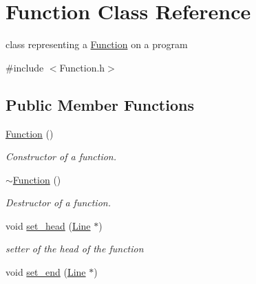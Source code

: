 \hypertarget{class_function}{}\section{Function Class Reference}
\label{class_function}


class representing a \hyperlink{class_function}{Function} on a program  




{\ttfamily \#include $<$Function.\+h$>$}

\subsection*{Public Member Functions}
\begin{DoxyCompactItemize}
\item 
\hypertarget{class_function_ae206568fd4fd4c885e3ccff76345c4e6}{}\hyperlink{class_function_ae206568fd4fd4c885e3ccff76345c4e6}{Function} ()\label{class_function_ae206568fd4fd4c885e3ccff76345c4e6}

\begin{DoxyCompactList}\small\item\em Constructor of a function. \end{DoxyCompactList}\item 
\hypertarget{class_function_a3b03f7cf0b75d16edebdda1dee1db6fd}{}\hyperlink{class_function_a3b03f7cf0b75d16edebdda1dee1db6fd}{$\sim$\+Function} ()\label{class_function_a3b03f7cf0b75d16edebdda1dee1db6fd}

\begin{DoxyCompactList}\small\item\em Destructor of a function. \end{DoxyCompactList}\item 
\hypertarget{class_function_a67ffa7175c8ab513df6db299b877ad97}{}void \hyperlink{class_function_a67ffa7175c8ab513df6db299b877ad97}{set\+\_\+head} (\hyperlink{class_line}{Line} $\ast$)\label{class_function_a67ffa7175c8ab513df6db299b877ad97}

\begin{DoxyCompactList}\small\item\em setter of the head of the function \end{DoxyCompactList}\item 
\hypertarget{class_function_af5b88d118098c4cd6e5e3a4d324b8b48}{}void \hyperlink{class_function_af5b88d118098c4cd6e5e3a4d324b8b48}{set\+\_\+end} (\hyperlink{class_line}{Line} $\ast$)\label{class_function_af5b88d118098c4cd6e5e3a4d324b8b48}


\end{DoxyCompactItemize}
